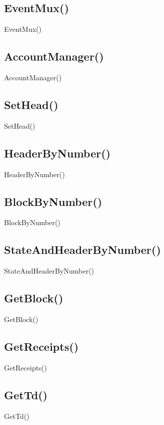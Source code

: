 \documentclass[letterpaper,10pt,english]{sphinxmanual}
\begin{document}
\subsection{EventMux()}
\label{\detokenize{topics/implementation:eventmux}}
EventMux()


\subsection{AccountManager()}
\label{\detokenize{topics/implementation:accountmanager}}
AccountManager()


\subsection{SetHead()}
\label{\detokenize{topics/implementation:sethead}}
SetHead()


\subsection{HeaderByNumber()}
\label{\detokenize{topics/implementation:headerbynumber}}
HeaderByNumber()


\subsection{BlockByNumber()}
\label{\detokenize{topics/implementation:blockbynumber}}
BlockByNumber()


\subsection{StateAndHeaderByNumber()}
\label{\detokenize{topics/implementation:stateandheaderbynumber}}
StateAndHeaderByNumber()


\subsection{GetBlock()}
\label{\detokenize{topics/implementation:getblock}}
GetBlock()


\subsection{GetReceipts()}
\label{\detokenize{topics/implementation:getreceipts}}
GetReceipts()


\subsection{GetTd()}
\label{\detokenize{topics/implementation:gettd}}
GetTd()
\end{document}
